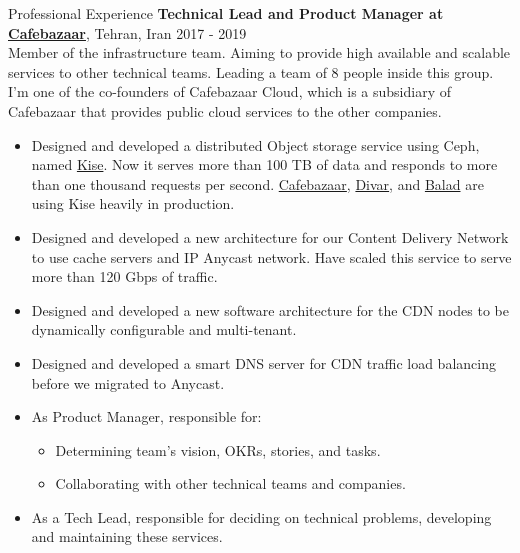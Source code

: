 \documentclass{resume} %
\begin{document}
\begin{rSection}{Professional Experience}
	{\bf Technical Lead and Product Manager at \href{https://cafebazaar.ir/}{Cafebazaar}}, Tehran, Iran \hfill 2017 - 2019
	\\ Member of the infrastructure team. Aiming to provide high available and scalable services to other technical teams. Leading a team of 8 people inside this group. I'm one of the co-founders of Cafebazaar Cloud, which is a subsidiary of Cafebazaar that provides public cloud services to the other companies.
	\begin{itemize}
		\item Designed and developed a distributed Object storage service using Ceph, named \href{https://kise.roo.cloud/}{Kise}. Now it serves more than 100 TB of data and responds to more than one thousand requests per second. \href{https://cafebazaar.ir/}{Cafebazaar}, \href{https://divar.ir/}{Divar}, and \href{http://balad.ir/}{Balad} are using Kise heavily in production.
		\item Designed and developed a new architecture for our Content Delivery Network to use cache servers and IP Anycast network. Have scaled this service to serve more than 120 Gbps of traffic.
		\item Designed and developed a new software architecture for the CDN nodes to be dynamically configurable and multi-tenant.
		\item Designed and developed a smart DNS server for CDN traffic load balancing before we migrated to Anycast.
		\item As Product Manager, responsible for:
		\begin{itemize}
			\item Determining team's vision, OKRs, stories, and tasks.
			\item Collaborating with other technical teams and companies.
		\end{itemize}
		\item As a Tech Lead, responsible for deciding on technical problems, developing and maintaining these services.
	\end{itemize}
	

\end{rSection}
\end{document}
